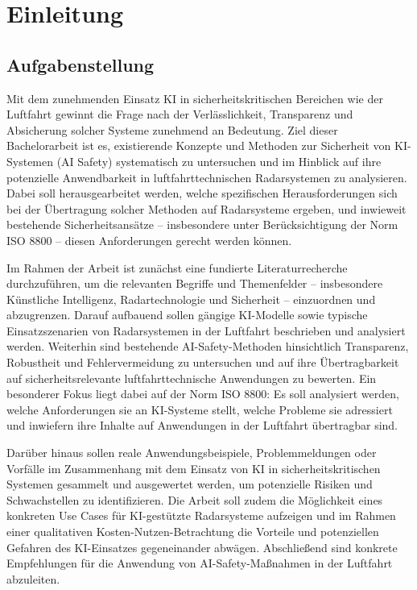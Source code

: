
\part{Einleitung}

\chapter{Aufgabenstellung}
Mit dem zunehmenden Einsatz \ac{KI} in sicherheitskritischen Bereichen wie der Luftfahrt gewinnt die Frage nach der Verlässlichkeit, Transparenz und Absicherung solcher Systeme zunehmend an Bedeutung. Ziel dieser Bachelorarbeit ist es, existierende Konzepte und Methoden zur Sicherheit von KI-Systemen (AI Safety) systematisch zu untersuchen und im Hinblick auf ihre potenzielle Anwendbarkeit in luftfahrttechnischen Radarsystemen zu analysieren. Dabei soll herausgearbeitet werden, welche spezifischen Herausforderungen sich bei der Übertragung solcher Methoden auf Radarsysteme ergeben, und inwieweit bestehende Sicherheitsansätze – insbesondere unter Berücksichtigung der Norm ISO 8800 – diesen Anforderungen gerecht werden können.

Im Rahmen der Arbeit ist zunächst eine fundierte Literaturrecherche durchzuführen, um die relevanten Begriffe und Themenfelder – insbesondere Künstliche Intelligenz, Radartechnologie und Sicherheit – einzuordnen und abzugrenzen. Darauf aufbauend sollen gängige KI-Modelle sowie typische Einsatzszenarien von Radarsystemen in der Luftfahrt beschrieben und analysiert werden. Weiterhin sind bestehende AI-Safety-Methoden hinsichtlich Transparenz, Robustheit und Fehlervermeidung zu untersuchen und auf ihre Übertragbarkeit auf sicherheitsrelevante luftfahrttechnische Anwendungen zu bewerten. Ein besonderer Fokus liegt dabei auf der Norm ISO 8800: Es soll analysiert werden, welche Anforderungen sie an KI-Systeme stellt, welche Probleme sie adressiert und inwiefern ihre Inhalte auf Anwendungen in der Luftfahrt übertragbar sind.

Darüber hinaus sollen reale Anwendungsbeispiele, Problemmeldungen oder Vorfälle im Zusammenhang mit dem Einsatz von \ac{KI} in sicherheitskritischen Systemen gesammelt und ausgewertet werden, um potenzielle Risiken und Schwachstellen zu identifizieren. Die Arbeit soll zudem die Möglichkeit eines konkreten Use Cases für KI-gestützte Radarsysteme aufzeigen und im Rahmen einer qualitativen Kosten-Nutzen-Betrachtung die Vorteile und potenziellen Gefahren des KI-Einsatzes gegeneinander abwägen. Abschließend sind konkrete Empfehlungen für die Anwendung von AI-Safety-Maßnahmen in der Luftfahrt abzuleiten. 

